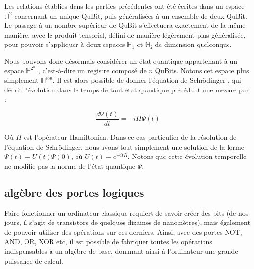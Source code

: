 \documentclass[a4paper,12pt]{report}
\newcommand{\icite}[1]{\up{\textit{\cite{#1}}}}
\begin{document}
\par{
	Les relations établies dans les parties précédentes ont été écrites dans un espace $\mathbb{H}^2$ concernant un unique QuBit, puis généralisées à un ensemble de deux QuBit. Le passage à un nombre supérieur de QuBit s'effectuera exactement de la même manière, avec le produit tensoriel, défini de manière légèrement plus généralisée, pour pouvoir s'appliquer à deux espaces $\mathbb{H}_{1}$ et $\mathbb{H}_{2}$ de dimension quelconque.
}

\vspace{1\baselineskip}

\par{
	Nous pouvons donc désormais considérer un état quantique appartenant à un espace $\mathbb{H}^{2^n}$ , c'est-à-dire un registre composé de $n$ QuBits. Notons cet espace plus simplement $\mathbb{H}^{\otimes n}$. Il est alors possible de donner l'équation de Schrödinger\icite{ref2} , qui décrit l'évolution dans le temps de tout état quantique précédant une mesure par :
}

\begin{equation}
	\frac{d \Psi(t)}{dt} = -i H \Psi(t)
\end{equation}

\vspace{1\baselineskip}

\par{
	Où $H$ est l'opérateur Hamiltonien. Dans ce cas particulier de la résolution de l'équation de Schrödinger, nous avons tout simplement une solution de la forme $\Psi(t) = U(t) \Psi(0)$, où $U(t) = e^{-itH}$. Notons que cette évolution temporelle ne modifie pas la norme de l'état quantique $\Psi$.
}

		\subsection{algèbre des portes logiques}

\par{
	Faire fonctionner un ordinateur classique requiert de savoir créer des bits (de nos jours, il s'agit de transistors de quelques dizaines de nanomètres), mais également de pouvoir utiliser des opérations sur ces derniers. Ainsi, avec des portes NOT, AND, OR, XOR etc, il est possible de fabriquer toutes les opérations indispensables à un algèbre de base, donnnant ainsi à l'ordinateur une grande puissance de calcul.
}

\vspace{1\baselineskip}
\end{document}
